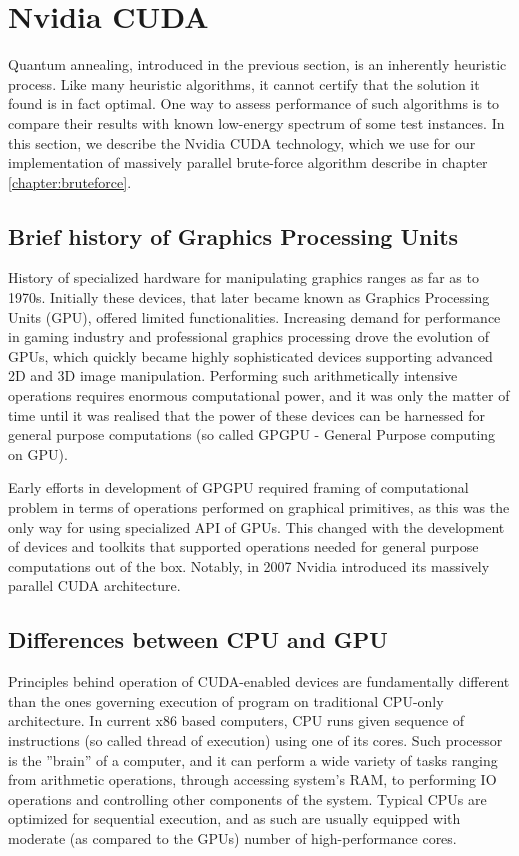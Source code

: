 \section{Nvidia CUDA}

Quantum annealing, introduced in the previous section, is an inherently heuristic process. Like many heuristic algorithms, it cannot certify that the solution it found is in fact optimal. One way to assess performance of such algorithms is to compare their results with known low-energy spectrum of some test instances. In this section, we describe the Nvidia CUDA technology, which we use for our implementation of massively parallel brute-force algorithm describe in chapter \ref{chapter:bruteforce}.

\subsection{Brief history of Graphics Processing Units}
History of specialized hardware for manipulating graphics ranges as far as to 1970s. Initially these devices, that later became known as Graphics Processing Units (GPU), offered limited functionalities. Increasing demand for performance in gaming industry and professional graphics processing drove the evolution of GPUs, which quickly became highly sophisticated devices supporting advanced 2D and 3D image manipulation. Performing such arithmetically intensive operations requires enormous computational power, and it was only the matter of time until it was realised that the power of these devices can be harnessed for general purpose computations (so called GPGPU - General Purpose computing on GPU).

Early efforts in development of GPGPU required framing of computational problem in terms of operations performed on graphical primitives, as this was the only way for using specialized API of GPUs. This changed with the development of devices and toolkits that supported operations needed for general purpose computations out of the box. Notably, in 2007 Nvidia introduced its massively parallel CUDA architecture.

\subsection{Differences between CPU and GPU}
Principles behind operation of CUDA-enabled devices are fundamentally different than the ones governing execution of program on traditional CPU-only architecture. In current x86 based computers, CPU runs given sequence of instructions (so called thread of execution) using one of its cores. Such processor is the ''brain'' of a computer, and it can perform a wide variety of tasks ranging from arithmetic operations, through accessing system's RAM, to performing IO operations and controlling other components of the system. Typical CPUs are optimized for sequential execution, and as such are usually equipped with moderate (as compared to the GPUs) number of high-performance cores.

